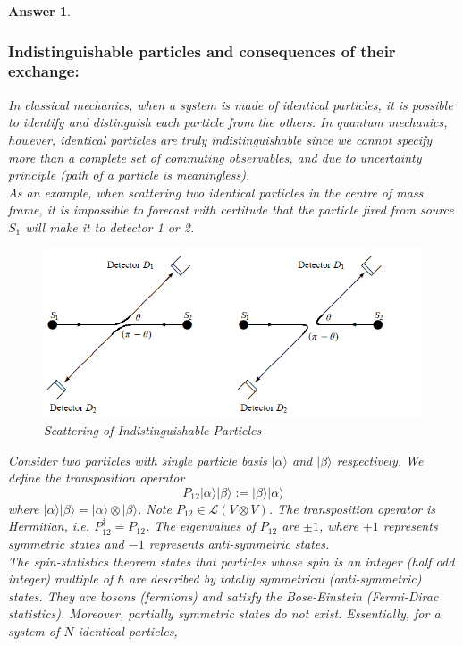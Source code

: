 \documentclass[a4paper]{article}
\newtheorem{ans}{Answer}[subsection]
\theoremstyle{new}
\begin{document}
\begin{ans}\leavevmode
\subsubsection*{Indistinguishable particles and consequences of their exchange:}
In classical mechanics, when a system is made of identical particles, it is possible to identify and distinguish each particle from the others. In quantum mechanics, however, identical particles are truly indistinguishable since we cannot specify more than a complete set of commuting observables, and due to uncertainty principle (path of a particle is meaningless).\\[5pt]
As an example, when scattering two identical particles in the centre of mass frame, it is impossible to forecast with certitude that the particle fired from source $S_1$ will make it to detector 1 or 2. 
\begin{figure}[H]
    \centering
    \includegraphics[width=\linewidth]{indistinguishable.PNG}
    \caption{Scattering of Indistinguishable Particles}
\end{figure}
Consider two particles with single particle basis $|\alpha\rangle$ and $|\beta\rangle$ respectively. We define the transposition operator
$$P_{12}|\alpha\rangle|\beta\rangle:=|\beta\rangle|\alpha\rangle$$
where $|\alpha\rangle|\beta\rangle=|\alpha\rangle\otimes|\beta\rangle$. Note $P_{12}\in\mathcal{L}(V\otimes V)$. The transposition operator is Hermitian, i.e. $P_{12}^\dag=P_{12}$. The eigenvalues of $P_{12}$ are $\pm1$, where $+1$ represents symmetric states and $-1$ represents anti-symmetric states.\\[5pt]
The spin-statistics theorem states that particles whose spin is an integer (half odd integer) multiple of $\hbar$ are described by totally symmetrical (anti-symmetric) states. They are bosons (fermions) and satisfy the Bose-Einstein (Fermi-Dirac statistics). Moreover, partially symmetric states do not exist. Essentially, for a system of $N$ identical particles,

\end{ans}
\end{document}
